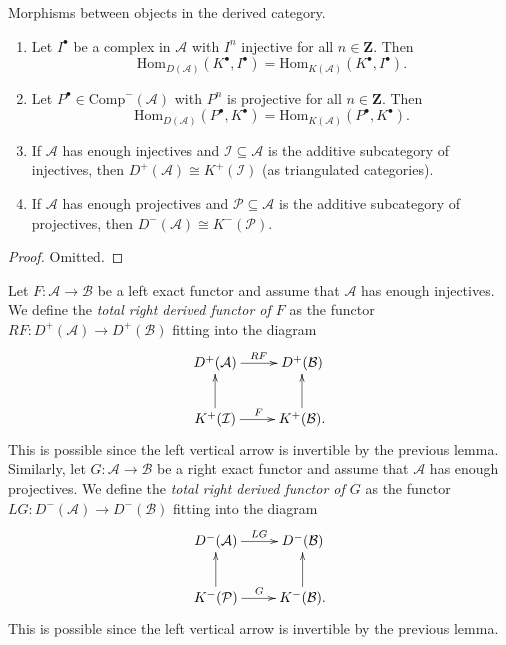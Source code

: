 \begin{lemma}
\label{lemma-derived-categories}
Morphisms between objects in the derived category.
\begin{enumerate}
\item
Let $I^\bullet$ be a complex in $\mathcal{A}$ with $I^n$ injective for all $n
\in \mathbf{Z}$. Then
$$
\text{Hom}_{D(\mathcal{A})}(K^\bullet, I^\bullet)
=
\text{Hom}_{K(\mathcal{A})}(K^\bullet, I^\bullet).
$$
\item
Let $P^\bullet \in \text{Comp}^-(\mathcal{A})$ with $P^n$ is projective for all
$n \in \mathbf{Z}$. Then
$$
\text{Hom}_{D(\mathcal{A})}(P^\bullet, K^\bullet)
=
\text{Hom}_{K(\mathcal{A})}(P^\bullet, K^\bullet).
$$
\item
If $\mathcal{A}$ has enough injectives and $\mathcal{I} \subseteq \mathcal{A}$
is the additive subcategory of injectives, then
$
D^+(\mathcal{A})\cong K^+(\mathcal{I})
$
(as triangulated categories).
\item
If $\mathcal{A}$ has enough projectives and $\mathcal{P} \subseteq \mathcal{A}$
is the additive subcategory of projectives, then
$
D^-(\mathcal{A}) \cong K^-(\mathcal{P}).
$
\end{enumerate}
\end{lemma}

\begin{proof}
Omitted.
\end{proof}

\begin{definition}
\label{definition-derived-functor}
Let $F: \mathcal{A} \to \mathcal{B}$ be a left exact functor and assume that
$\mathcal{A}$ has enough injectives. We define the {\it total right derived
functor of $F$} as the functor $RF: D^+(\mathcal{A}) \to D^+(\mathcal{B})$
fitting into the diagram
$$
\xymatrix{
D^+(\mathcal{A}) \ar[r]^{RF} & D^+(\mathcal{B}) \\
K^+(\mathcal I) \ar[u] \ar[r]^F & K^+(\mathcal{B}). \ar[u]
}
$$
This is possible since the left vertical arrow is invertible by the previous
lemma. Similarly, let $G: \mathcal{A} \to \mathcal{B}$ be a right exact
functor and assume that $\mathcal{A}$ has enough projectives. We define the
{\it total right derived functor of $G$} as the functor $LG: D^-(\mathcal{A})
\to D^-(\mathcal{B})$ fitting into the diagram
$$
\xymatrix{
D^-(\mathcal{A}) \ar[r]^{LG} & D^-(\mathcal{B}) \\
K^-(\mathcal{P}) \ar[u] \ar[r]^G & K^-(\mathcal{B}). \ar[u]
}
$$
This is possible since the left vertical arrow is invertible by the previous
lemma.
\end{definition}

